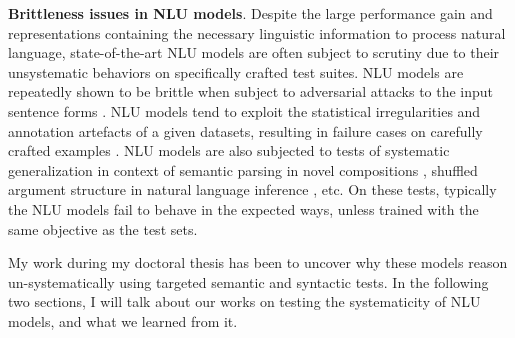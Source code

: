 \documentclass[12pt]{article}
\newcommand{\xhdr}[1]{{\noindent\bfseries #1}.}
\begin{document}
\xhdr{Brittleness issues in NLU models} Despite the large performance gain and representations containing the necessary linguistic information to process natural language, state-of-the-art NLU models are often subject to scrutiny due to their unsystematic behaviors on specifically crafted test suites. NLU models are repeatedly shown to be brittle when subject to adversarial attacks \cite{jia2016,jin2020bert} to the input sentence forms \cite{kaushik2018much}. NLU models tend to exploit the statistical irregularities and annotation artefacts \cite{gururangan2018a,poliak-etal-2018-hypothesis,tsuchiya-2018-performance} of a given datasets, resulting in failure cases on carefully crafted examples \cite{naik-etal-2018-stress,mccoy2019}.
NLU models are also subjected to tests of systematic generalization in context of semantic parsing in novel compositions \cite{lake2017generalization}, shuffled argument structure in natural language inference \cite{dasgupta-etal-2018-evaluating}, etc. On these tests, typically the NLU models fail to behave in the expected ways, unless trained with the same objective as the test sets.

My work during my doctoral thesis has been to uncover why these models reason un-systematically using targeted semantic and syntactic tests. In the following two sections, I will talk about our works on testing the systematicity of NLU models, and what we learned from it.










\end{document}
